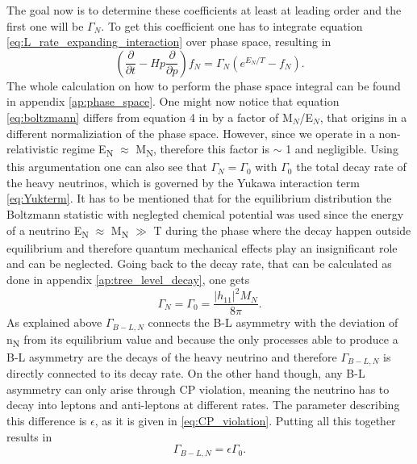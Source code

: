 The goal now is to determine these coefficients at least at leading order and the first one will be $\Gamma_N$. To get this coefficient one has to integrate equation \eqref{eq:L_rate_expanding_interaction} over phase space, resulting in
\begin{equation}
	\left(\frac{\partial}{\partial t}-Hp\frac{\partial}{\partial p}\right)f_N=\Gamma_N\left(e^{E_N/T}-f_N\right).
	\label{eq:boltzmann}
\end{equation}
The whole calculation on how to perform the phase space integral can be found in appendix \ref{ap:phase_space}. \newline\indent
One might now notice that equation \eqref{eq:boltzmann} differs from equation 4 in \cite{Bodeker:2013qaa} by a factor of M$_N$/E$_N$, that origins in a different normaliziation of the phase space. However, since we operate in a non-relativistic regime E\textsubscript{N} $\approx$ M\textsubscript{N}, therefore this factor is $\sim$ 1 and negligible. Using this argumentation one can also see that $\Gamma_N=\Gamma_0$ with $\Gamma_0$ the total decay rate of the heavy neutrinos, which is governed by the Yukawa interaction term \eqref{eq:Yukterm}. It has to be mentioned that for the equilibrium distribution the Boltzmann statistic with neglegted chemical potential was used since the energy of a neutrino E\textsubscript{N} $\approx$ M\textsubscript{N} $\gg$ T during the phase where the decay happen outside equilibrium and therefore quantum mechanical effects play an insignificant role and can be neglected. Going back to the decay rate, that can be calculated as done in appendix \ref{ap:tree_level_decay}, one gets
\begin{equation}
\Gamma_N=\Gamma_0=\frac{|h_{11}|^2M_N}{8\pi}.
\label{eq:Gamma_N}
\end{equation}
As explained above $\Gamma_{B-L,N}$ connects the B-L asymmetry with the deviation of n\textsubscript{N} from its equilibrium value and because the only processes able to produce a B-L asymmetry  are the decays of the heavy neutrino and therefore $\Gamma_{B-L,N}$ is directly connected to its decay rate. On the other hand though, any B-L asymmetry can only arise through CP violation, meaning the neutrino has to decay into leptons and anti-leptons at different rates. The parameter describing this difference is $\epsilon$, as it is given in \eqref{eq:CP_violation}. Putting all this together results in 
\begin{equation}
	\Gamma_{B-L,N}=\epsilon\Gamma_0.
	\label{eq:Gamma_B-L,N}
\end{equation}
